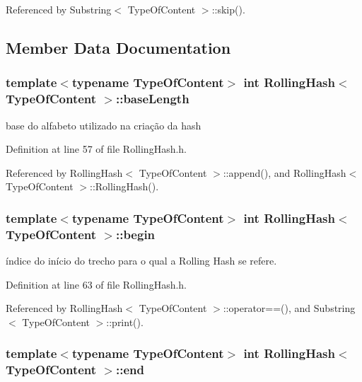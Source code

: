 Referenced by Substring$<$ Type\+Of\+Content $>$\+::skip().



\subsection{Member Data Documentation}
\hypertarget{classRollingHash_aea18bfbf983b35d528fa634d5f08c810}{
\subsubsection[{base\+Length}]{\setlength{\rightskip}{0pt plus 5cm}template$<$typename Type\+Of\+Content$>$ int {\bf Rolling\+Hash}$<$ Type\+Of\+Content $>$\+::base\+Length}}\label{classRollingHash_aea18bfbf983b35d528fa634d5f08c810}


base do alfabeto utilizado na criação da hash 



Definition at line 57 of file Rolling\+Hash.\+h.



Referenced by Rolling\+Hash$<$ Type\+Of\+Content $>$\+::append(), and Rolling\+Hash$<$ Type\+Of\+Content $>$\+::\+Rolling\+Hash().

\hypertarget{classRollingHash_ae1516e16a6167fbe36b46af49614c6af}{
\subsubsection[{begin}]{\setlength{\rightskip}{0pt plus 5cm}template$<$typename Type\+Of\+Content$>$ int {\bf Rolling\+Hash}$<$ Type\+Of\+Content $>$\+::begin}}\label{classRollingHash_ae1516e16a6167fbe36b46af49614c6af}


índice do início do trecho para o qual a Rolling Hash se refere. 



Definition at line 63 of file Rolling\+Hash.\+h.



Referenced by Rolling\+Hash$<$ Type\+Of\+Content $>$\+::operator==(), and Substring$<$ Type\+Of\+Content $>$\+::print().

\hypertarget{classRollingHash_aa3f8e695a18340a65fbe29abc46e90ff}{
\subsubsection[{end}]{\setlength{\rightskip}{0pt plus 5cm}template$<$typename Type\+Of\+Content$>$ int {\bf Rolling\+Hash}$<$ Type\+Of\+Content $>$\+::end}}\label{classRollingHash_aa3f8e695a18340a65fbe29abc46e90ff}


